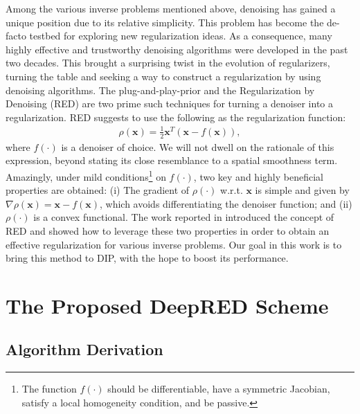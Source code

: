 \documentclass[12pt]{article}
\def\x{{\mathbf x}}
\begin{document}
Among the various inverse problems mentioned above, denoising has gained a unique position due to its relative simplicity. This problem has become the de-facto testbed for exploring new regularization ideas. As a consequence, many highly effective and trustworthy denoising algorithms were developed in the past two decades. This brought a surprising twist in the evolution of regularizers, turning the table and seeking a way to construct a regularization by using denoising algorithms. The plug-and-play-prior \cite{venkatakrishnan2013plug} and the Regularization by Denoising (RED) \cite{RED-2017} are two prime such techniques for turning a denoiser into a regularization. RED suggests to use the following as the regularization function: 
\begin{eqnarray}\label{eq:RED}
\rho(\x) = \frac{1}{2}\x^T (\x-f(\x)),
\end{eqnarray}
where $f(\cdot)$ is a denoiser of choice. We will not dwell on the rationale of this expression, beyond stating its close resemblance to a spatial smoothness term. Amazingly, under mild conditions\footnote{The function $f(\cdot)$ should be differentiable, have a symmetric Jacobian, satisfy a local homogeneity condition, and be passive.} on $f(\cdot)$,  two key and highly beneficial properties are obtained: (i) The gradient of $\rho(\cdot)$ w.r.t. $\x$ is simple and given by 
$ \nabla \rho(\x)= \x-f(\x)$, which avoids differentiating the denoiser function; and (ii) $\rho(\cdot)$ is a convex functional. The work reported in \cite{RED-2017} introduced the concept of RED and showed how to leverage these two properties in order to obtain an effective regularization for various inverse problems. Our goal in this work is to bring this method to DIP, with the hope to boost its performance. 



\section{The Proposed DeepRED Scheme}
\label{sec:Proposed}

\subsection{Algorithm Derivation}
\end{document}
